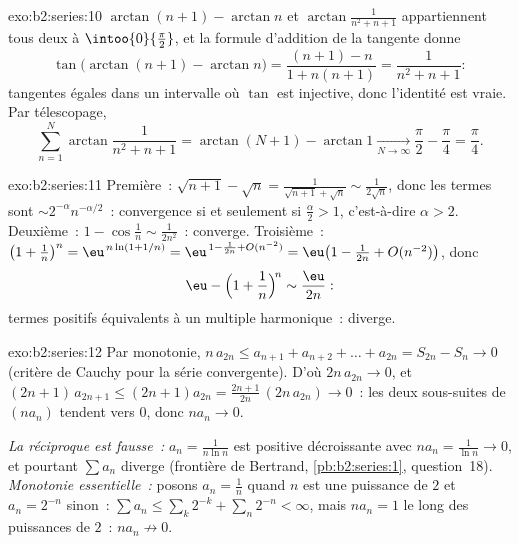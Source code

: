 \begin{solution}{exo:b2:series:10}
$\arctan(n+1) - \arctan n$ et $\arctan\frac{1}{n^2+n+1}$ appartiennent
tous deux à $\intoo{0}{\frac\pi2}$, et la formule d'addition de la
tangente donne
\[
\tan\bigl(\arctan(n{+}1) - \arctan n\bigr)
= \frac{(n+1) - n}{1 + n(n+1)} = \frac{1}{n^2 + n + 1} :
\]
tangentes égales dans un intervalle où $\tan$ est injective, donc
l'identité est vraie. Par télescopage,
\[
\sum_{n=1}^{N}\arctan\frac{1}{n^2+n+1}
= \arctan(N{+}1) - \arctan 1 \xrightarrow[N\to\infty]{}
\frac\pi2 - \frac\pi4 = \frac\pi4 .
\]

\end{solution}

\begin{solution}{exo:b2:series:11}
Première~: $\sqrt{n+1} - \sqrt n = \frac{1}{\sqrt{n+1} + \sqrt n}
\sim \frac{1}{2\sqrt n}$, donc les termes sont $\sim
2^{-\alpha}n^{-\alpha/2}$~: convergence si et seulement si
$\frac\alpha2 > 1$, c'est-à-dire $\alpha > 2$. Deuxième~: $1 -
\cos\frac1n \sim \frac{1}{2n^2}$~: converge. Troisième~: $\bigl(1 +
\frac1n\bigr)^n = \eu^{\,n\ln(1 + 1/n)} = \eu^{\,1 - \frac1{2n} +
O(n^{-2})} = \eu\bigl(1 - \frac{1}{2n} + O(n^{-2})\bigr)$, donc
\[
\eu - \Bigl(1 + \frac1n\Bigr)^{\!n} \sim \frac{\eu}{2n} :
\]
termes positifs équivalents à un multiple harmonique~: diverge.
\end{solution}

\begin{solution}{exo:b2:series:12}
Par monotonie, $n\,a_{2n} \leq a_{n+1} + a_{n+2} + \dots +
a_{2n} = S_{2n} - S_n \to 0$ (critère de Cauchy pour la série
convergente). D'où $2n\,a_{2n} \to 0$, et $(2n{+}1)\,
a_{2n+1} \leq (2n{+}1)a_{2n} = \frac{2n+1}{2n}\,(2n\,a_{2n}) \to
0$~: les deux sous-suites de $(na_n)$ tendent vers $0$, donc $na_n
\to 0$.

\emph{La réciproque est fausse~:} $a_n = \frac1{n\ln n}$ est positive
décroissante avec $na_n = \frac1{\ln n} \to 0$, et pourtant $\sum a_n$
diverge (frontière de Bertrand, \cref{pb:b2:series:1}, question~18).
\emph{Monotonie essentielle~:} posons $a_n = \frac1n$ quand $n$ est
une puissance de $2$ et $a_n = 2^{-n}$ sinon~: $\sum a_n \leq
\sum_k 2^{-k} + \sum_n 2^{-n} < \infty$, mais $na_n = 1$ le long des
puissances de $2$~: $na_n \not\to 0$.
\end{solution}

